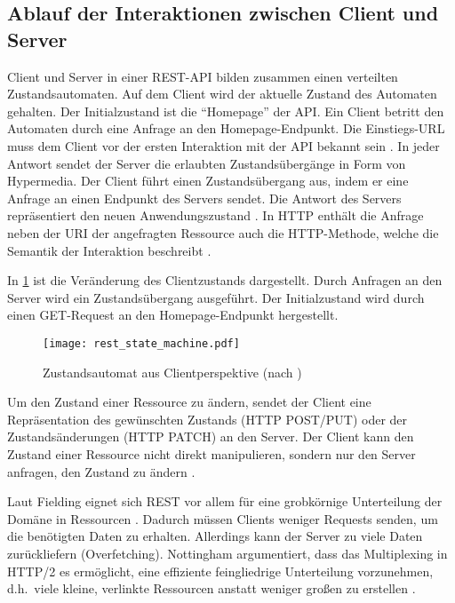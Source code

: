 \subsection{Ablauf der Interaktionen zwischen Client und Server}\label{subsec:theory|rest|interaction}
Client und Server in einer REST-API bilden zusammen einen verteilten Zustandsautomaten. Auf dem Client wird der aktuelle Zustand des Automaten gehalten. Der Initialzustand ist die \enquote{Homepage} der API. Ein Client betritt den Automaten durch eine Anfrage an den Homepage-Endpunkt. Die Einstiegs-URL muss dem Client vor der ersten Interaktion mit der API bekannt sein \autocite{Fielding2008}. In jeder Antwort sendet der Server die erlaubten Zustandsübergänge in Form von Hypermedia. Der Client führt einen Zustandsübergang aus, indem er eine Anfrage an einen Endpunkt des Servers sendet. Die Antwort des Servers repräsentiert den neuen Anwendungszustand \autocite[S.~2--11]{Richardson2013}. In HTTP enthält die Anfrage neben der URI der angefragten Ressource auch die HTTP-Methode, welche die Semantik der Interaktion beschreibt \autocite[S.~11]{Webber2010}.

In \cref{fig:rest-state-machine} ist die Veränderung des Clientzustands dargestellt. Durch Anfragen an den Server wird ein Zustandsübergang ausgeführt. Der Initialzustand wird durch einen GET-Request an den Homepage-Endpunkt hergestellt.

\begin{figure}
    \centering
    \texttt{[image: rest\_state\_machine.pdf]}
    \caption{Zustandsautomat aus Clientperspektive (nach \autocite[Abb.~1-7]{Richardson2013})}
    \label{fig:rest-state-machine} %
\end{figure}
Um den Zustand einer Ressource zu ändern, sendet der Client eine Repräsentation des gewünschten Zustands (HTTP POST/PUT) oder der Zustandsänderungen (HTTP PATCH) an den Server. Der Client kann den Zustand einer Ressource nicht direkt manipulieren, sondern nur den Server anfragen, den Zustand zu ändern \autocite[S.~12f.]{Richardson2013}.

\para{}Laut Fielding eignet sich REST vor allem für eine grobkörnige Unterteilung der Domäne in Ressourcen \autocite[S.~101]{Fielding2000}. Dadurch müssen Clients weniger Requests senden, um die benötigten Daten zu erhalten. Allerdings kann der Server zu viele Daten zurückliefern (Overfetching). Nottingham argumentiert, dass das Multiplexing in HTTP/2 es ermöglicht, eine effiziente feingliedrige Unterteilung vorzunehmen, d.h.\ viele kleine, verlinkte Ressourcen anstatt weniger großen zu erstellen \autocite{Nottingham2019}.

